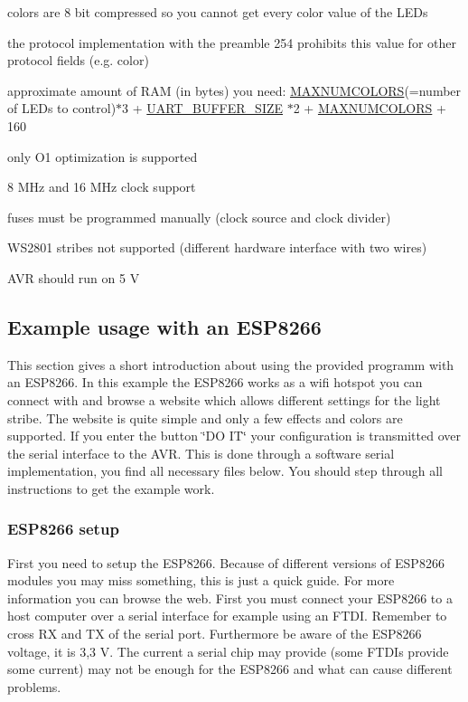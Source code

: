\begin{DoxyItemize}
\item colors are 8 bit compressed so you cannot get every color value of the L\+E\+Ds 
\item the protocol implementation with the preamble 254 prohibits this value for other protocol fields (e.\+g. color) 
\item approximate amount of R\+A\+M (in bytes) you need\+: \hyperlink{globals_8h_a6e2b9e79df9491377ae405ef85aa0ca5}{M\+A\+X\+N\+U\+M\+C\+O\+L\+O\+R\+S}(=number of L\+E\+Ds to control)$\ast$3 + \hyperlink{globals_8h_a0d57378e32bf8278011460740bc29f7f}{U\+A\+R\+T\+\_\+\+B\+U\+F\+F\+E\+R\+\_\+\+S\+I\+Z\+E} $\ast$2 + \hyperlink{globals_8h_a6e2b9e79df9491377ae405ef85aa0ca5}{M\+A\+X\+N\+U\+M\+C\+O\+L\+O\+R\+S} + 160 
\item only O1 optimization is supported 
\item 8 M\+Hz and 16 M\+Hz clock support 
\item fuses must be programmed manually (clock source and clock divider) 
\item W\+S2801 stribes not supported (different hardware interface with two wires) 
\item A\+V\+R should run on 5 V 
\end{DoxyItemize}\hypertarget{index_esp_sec}{}\subsection{Example usage with an E\+S\+P8266}\label{index_esp_sec}
This section gives a short introduction about using the provided programm with an E\+S\+P8266. In this example the E\+S\+P8266 works as a wifi hotspot you can connect with and browse a website which allows different settings for the light stribe. The website is quite simple and only a few effects and colors are supported. If you enter the button \char`\"{}\+D\+O I\+T\char`\"{} your configuration is transmitted over the serial interface to the A\+V\+R. This is done through a software serial implementation, you find all necessary files below. You should step through all instructions to get the example work.\hypertarget{index_setup_esp}{}\subsubsection{E\+S\+P8266 setup}\label{index_setup_esp}
First you need to setup the E\+S\+P8266. Because of different versions of E\+S\+P8266 modules you may miss something, this is just a quick guide. For more information you can browse the web. First you must connect your E\+S\+P8266 to a host computer over a serial interface for example using an F\+T\+D\+I. Remember to cross R\+X and T\+X of the serial port. Furthermore be aware of the E\+S\+P8266 voltage, it is 3,3 V. The current a serial chip may provide (some F\+T\+D\+Is provide some current) may not be enough for the E\+S\+P8266 and what can cause different problems. ~\newline

